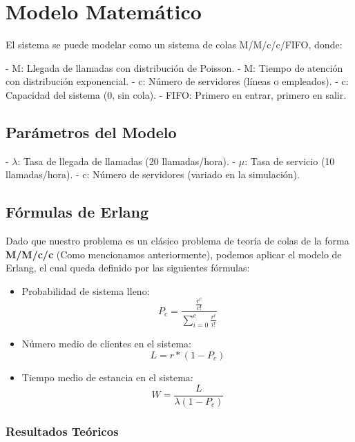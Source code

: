 \documentclass{article}
\begin{document}
\subsection{}


\section{Modelo Matemático}

El sistema se puede modelar como un sistema de colas M/M/c/c/FIFO, donde:

- M: Llegada de llamadas con distribución de Poisson.
- M: Tiempo de atención con distribución exponencial.
- c: Número de servidores (líneas o empleados).
- c: Capacidad del sistema (0, sin cola).
- FIFO: Primero en entrar, primero en salir.


\subsection{Parámetros del Modelo}

- $\lambda$: Tasa de llegada de llamadas (20 llamadas/hora).
- $\mu$: Tasa de servicio (10 llamadas/hora).
- c: Número de servidores (variado en la simulación).

\subsection{Fórmulas de Erlang}

Dado que nuestro problema es un clásico problema de teoría de colas de la forma \textbf{M/M/c/c} (Como mencionamos anteriormente), podemos aplicar el modelo de Erlang, el cual queda definido por las siguientes fórmulas:

\begin{itemize}
    \item Probabilidad de sistema lleno: 
    \[
    P_c = \frac{\frac{r^c}{c!}}{\sum_{i=0}^{c} \frac{r^i}{i!}}
    \]
    \item Número medio de clientes en el sistema: 
    \[
    L = r*(1- P_c)
    \]
    \item Tiempo medio de estancia en el sistema: 
    \[
    W = \frac{L}{\lambda (1 - P_c)}
    \]
\end{itemize}

\subsubsection*{Resultados Teóricos}
\end{document}
